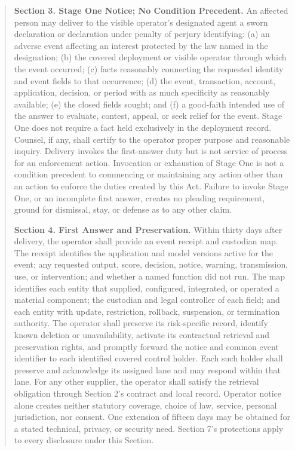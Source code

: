 \begin{quote}
\textbf{Section 3. Stage One Notice; No Condition Precedent.} An affected person may deliver to the visible operator's designated agent a sworn declaration or declaration under penalty of perjury identifying: (a) an adverse event affecting an interest protected by the law named in the designation; (b) the covered deployment or visible operator through which the event occurred; (c) facts reasonably connecting the requested identity and event fields to that occurrence; (d) the event, transaction, account, application, decision, or period with as much specificity as reasonably available; (e) the closed fields sought; and (f) a good-faith intended use of the answer to evaluate, contest, appeal, or seek relief for the event. Stage One does not require a fact held exclusively in the deployment record. Counsel, if any, shall certify to the operator proper purpose and reasonable inquiry. Delivery invokes the first-answer duty but is not service of process for an enforcement action. Invocation or exhaustion of Stage One is not a condition precedent to commencing or maintaining any action other than an action to enforce the duties created by this Act. Failure to invoke Stage One, or an incomplete first answer, creates no pleading requirement, ground for dismissal, stay, or defense as to any other claim.

\textbf{Section 4. First Answer and Preservation.} Within thirty days after delivery, the operator shall provide an event receipt and custodian map. The receipt identifies the application and model versions active for the event; any requested output, score, decision, notice, warning, transmission, use, or intervention; and whether a named function did not run. The map identifies each entity that supplied, configured, integrated, or operated a material component; the custodian and legal controller of each field; and each entity with update, restriction, rollback, suspension, or termination authority. The operator shall preserve its risk-specific record, identify known deletion or unavailability, activate its contractual retrieval and preservation rights, and promptly forward the notice and common event identifier to each identified covered control holder. Each such holder shall preserve and acknowledge its assigned lane and may respond within that lane. For any other supplier, the operator shall satisfy the retrieval obligation through Section 2's contract and local record. Operator notice alone creates neither statutory coverage, choice of law, service, personal jurisdiction, nor consent. One extension of fifteen days may be obtained for a stated technical, privacy, or security need. Section 7's protections apply to every disclosure under this Section.


\end{quote}
